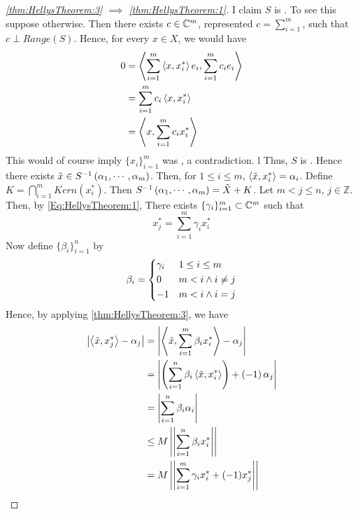 \begin{thm}
\begin{proof}[\ref{thm:HellysTheorem:3} $\implies$ \ref{thm:HellysTheorem:1}]
        I claim $S$ is \Surjective. 
        To see this suppose otherwise. 
        Then there exists $c \in \mathbb{C}^m$, represented $c=\sum_{i=1}^m$, such that 
        $c \perp Range(S)$. 
        Hence, for every $x \in X$, we would have 
        \begin{align*}
        0 & = \left\langle \sum\limits_{i=1}^m \left\langle x, x_i^* \right\rangle e_i, \sum\limits_{i=1}^m c_i e_i \right\rangle\\
        & = \sum_{i=1}^m c_i \left\langle x, x_i^* \right\rangle\\
        & = \left\langle x, \sum\limits_{i=1}^m c_i x_i^* \right\rangle
        \end{align*}
        This would of course imply $\{x_i\}_{i=1}^m$ was \LinearlyDependent, a contradiction. l
        Thus, $S$ is \Surjective. 
        Hence there exists  $\tilde{x} \in S^{-1}\left( \alpha_1, \cdots, \alpha_m\right)$. 
        Then, for $1 \leq i \leq m$, $\left\langle \tilde{x}, x_i^* \right\rangle = \alpha_i$. 
        Define $K=\bigcap\limits_{i=1}^{m}Kern(x_i^*)$. 
        Then $S^{-1}\left( \alpha_1, \cdots, \alpha_m\right) = \tilde{X}+K$. 
        Let $m<j \leq n$, $j \in \mathbb{Z}$. Then, by 
        \ref{Eq:HellysTheorem:1}, 
        There exists $\{\gamma_i\}_{i=1}^m \subset \mathbb{C}^m$ such that 
        \begin{equation*}
        x_j^*= \sum_{i=1}^m \gamma_i x_i^*
        \end{equation*}
        Now define $\{\beta_i\}_{i=1}^n $ by 
        \begin{equation}
        \beta_i = \begin{dcases}
        \gamma_i & 1 \leq i \leq m \\
        0 & m < i \wedge i \neq j \\
        -1 & m < i \wedge i = j
        \end{dcases}
        \end{equation}
        Hence, 
        by applying \ref{thm:HellysTheorem:3}, 
        we have 
        \begin{align*}
        \abs{\ip{\tilde{x}, x_j^*}-\alpha_j} 
        & = \abs{\ip{\tilde{x}, \sum\limits_{i=1}^m \beta_ix_i^*}-\alpha_j}\\
        & = \abs{\pa{\sum_{i=1}^n \beta_i \ip{\tilde{x}, x_i^*}} + \pa{-1} \alpha_j}\\
        & = \abs{\sum\limits_{i=1}^n \beta_i\alpha_i} \\ 
        & \leq M \norm{\sum\limits_{i=1}^n \beta_i x_i^*}\\
        & = M \norm{\sum\limits_{i=1}^m \gamma_ix_i^* + (-1) x_j^*}\\

\end{align*}
\end{proof}
\end{thm}
